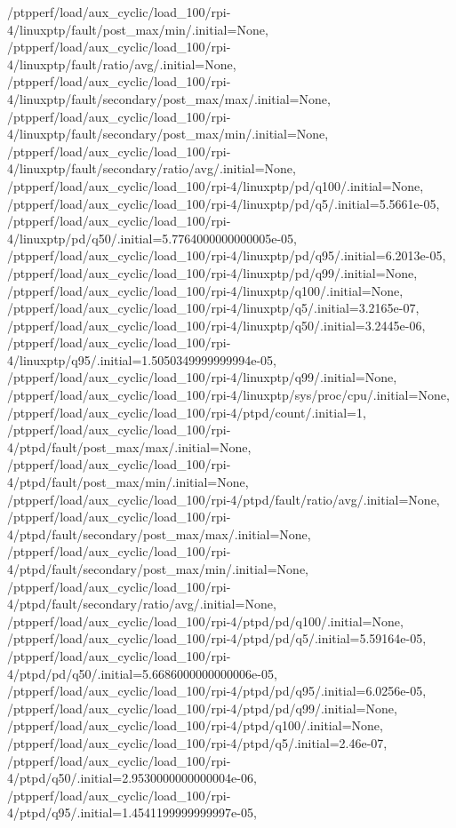 {    /ptpperf/load/aux_cyclic/load_100/rpi-4/linuxptp/fault/post_max/min/.initial=None,
    /ptpperf/load/aux_cyclic/load_100/rpi-4/linuxptp/fault/ratio/avg/.initial=None,
    /ptpperf/load/aux_cyclic/load_100/rpi-4/linuxptp/fault/secondary/post_max/max/.initial=None,
    /ptpperf/load/aux_cyclic/load_100/rpi-4/linuxptp/fault/secondary/post_max/min/.initial=None,
    /ptpperf/load/aux_cyclic/load_100/rpi-4/linuxptp/fault/secondary/ratio/avg/.initial=None,
    /ptpperf/load/aux_cyclic/load_100/rpi-4/linuxptp/pd/q100/.initial=None,
    /ptpperf/load/aux_cyclic/load_100/rpi-4/linuxptp/pd/q5/.initial=5.5661e-05,
    /ptpperf/load/aux_cyclic/load_100/rpi-4/linuxptp/pd/q50/.initial=5.7764000000000005e-05,
    /ptpperf/load/aux_cyclic/load_100/rpi-4/linuxptp/pd/q95/.initial=6.2013e-05,
    /ptpperf/load/aux_cyclic/load_100/rpi-4/linuxptp/pd/q99/.initial=None,
    /ptpperf/load/aux_cyclic/load_100/rpi-4/linuxptp/q100/.initial=None,
    /ptpperf/load/aux_cyclic/load_100/rpi-4/linuxptp/q5/.initial=3.2165e-07,
    /ptpperf/load/aux_cyclic/load_100/rpi-4/linuxptp/q50/.initial=3.2445e-06,
    /ptpperf/load/aux_cyclic/load_100/rpi-4/linuxptp/q95/.initial=1.5050349999999994e-05,
    /ptpperf/load/aux_cyclic/load_100/rpi-4/linuxptp/q99/.initial=None,
    /ptpperf/load/aux_cyclic/load_100/rpi-4/linuxptp/sys/proc/cpu/.initial=None,
    /ptpperf/load/aux_cyclic/load_100/rpi-4/ptpd/count/.initial=1,
    /ptpperf/load/aux_cyclic/load_100/rpi-4/ptpd/fault/post_max/max/.initial=None,
    /ptpperf/load/aux_cyclic/load_100/rpi-4/ptpd/fault/post_max/min/.initial=None,
    /ptpperf/load/aux_cyclic/load_100/rpi-4/ptpd/fault/ratio/avg/.initial=None,
    /ptpperf/load/aux_cyclic/load_100/rpi-4/ptpd/fault/secondary/post_max/max/.initial=None,
    /ptpperf/load/aux_cyclic/load_100/rpi-4/ptpd/fault/secondary/post_max/min/.initial=None,
    /ptpperf/load/aux_cyclic/load_100/rpi-4/ptpd/fault/secondary/ratio/avg/.initial=None,
    /ptpperf/load/aux_cyclic/load_100/rpi-4/ptpd/pd/q100/.initial=None,
    /ptpperf/load/aux_cyclic/load_100/rpi-4/ptpd/pd/q5/.initial=5.59164e-05,
    /ptpperf/load/aux_cyclic/load_100/rpi-4/ptpd/pd/q50/.initial=5.6686000000000006e-05,
    /ptpperf/load/aux_cyclic/load_100/rpi-4/ptpd/pd/q95/.initial=6.0256e-05,
    /ptpperf/load/aux_cyclic/load_100/rpi-4/ptpd/pd/q99/.initial=None,
    /ptpperf/load/aux_cyclic/load_100/rpi-4/ptpd/q100/.initial=None,
    /ptpperf/load/aux_cyclic/load_100/rpi-4/ptpd/q5/.initial=2.46e-07,
    /ptpperf/load/aux_cyclic/load_100/rpi-4/ptpd/q50/.initial=2.9530000000000004e-06,
    /ptpperf/load/aux_cyclic/load_100/rpi-4/ptpd/q95/.initial=1.4541199999999997e-05,
}
